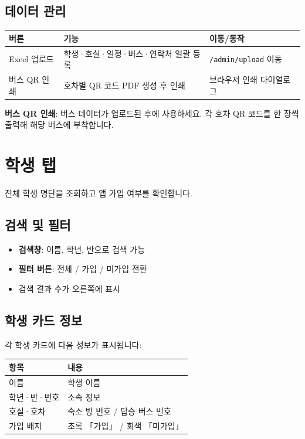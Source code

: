 \documentclass[a4paper,11pt]{article}
\begin{document}
\subsection{데이터 관리}

\begin{center}
\begin{tabular}{@{}lll@{}}
  \toprule
  \textbf{버튼} & \textbf{기능} & \textbf{이동/동작} \\
  \midrule
  Excel 업로드 & 학생·호실·일정·버스·연락처 일괄 등록 & \texttt{/admin/upload} 이동 \\
  버스 QR 인쇄 & 호차별 QR 코드 PDF 생성 후 인쇄 & 브라우저 인쇄 다이얼로그 \\
  \bottomrule
\end{tabular}
\end{center}

\begin{tcolorbox}[tipbox]
\textbf{버스 QR 인쇄}: 버스 데이터가 업로드된 후에 사용하세요.
각 호차 QR 코드를 한 장씩 출력해 해당 버스에 부착합니다.
\end{tcolorbox}

\section{학생 탭}

전체 학생 명단을 조회하고 앱 가입 여부를 확인합니다.

\subsection{검색 및 필터}

\begin{itemize}
  \item \textbf{검색창}: 이름, 학년, 반으로 검색 가능
  \item \textbf{필터 버튼}: 전체 / 가입 / 미가입 전환
  \item 검색 결과 수가 오른쪽에 표시
\end{itemize}

\subsection{학생 카드 정보}

각 학생 카드에 다음 정보가 표시됩니다:

\begin{center}
\begin{tabular}{@{}ll@{}}
  \toprule
  \textbf{항목} & \textbf{내용} \\
  \midrule
  이름 & 학생 이름 \\
  학년·반·번호 & 소속 정보 \\
  호실·호차 & 숙소 방 번호 / 탑승 버스 번호 \\
  가입 배지 & 초록 「가입」 / 회색 「미가입」 \\
  \bottomrule
\end{tabular}
\end{center}
\end{document}
